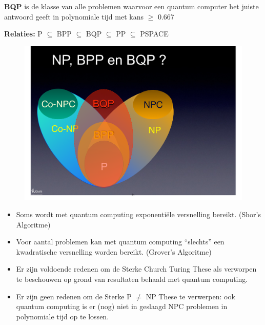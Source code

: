 \documentclass[]{article}
\begin{document}
\textbf{BQP} is de klasse van alle problemen waarvoor een quantum computer het juiste antwoord geeft in polynomiale tijd met kans $\geq$ 0.667

\textbf{Relaties:} P $\subseteq$ BPP $\subseteq$ BQP $\subseteq$ PP $\subseteq$ PSPACE

\begin{figure}[H]
\centering
\includegraphics[width=0.6\columnwidth]{slides/bqp}
\end{figure}

\begin{itemize}
\item Soms wordt met quantum computing exponenti\"ele versnelling bereikt. (Shor's Algoritme)
\item Voor aantal problemen kan met quantum computing ``slechts'' een kwadratische versnelling worden bereikt. (Grover's Algoritme)
\item Er zijn voldoende redenen om de Sterke Church Turing These als verworpen te beschouwen op grond van resultaten behaald met quantum computing.
\item Er zijn geen redenen om de Sterke P $\not=$ NP These te verwerpen: ook quantum computing is er (nog) niet in geslaagd NPC problemen in polynomiale tijd op te lossen.
\end{itemize}
\end{document}
